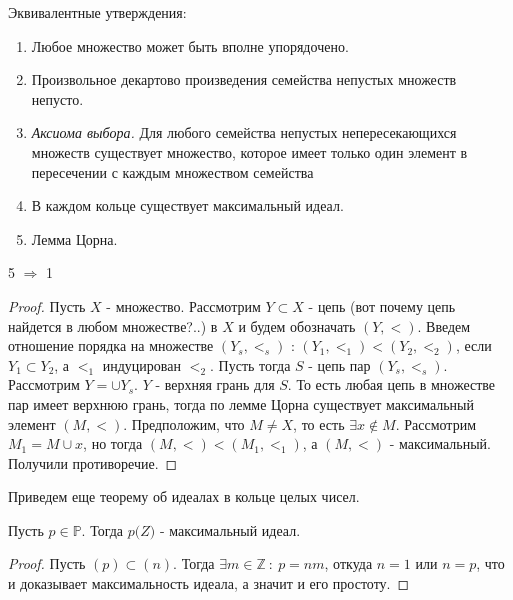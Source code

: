 \pagebreak

Эквивалентные утверждения:

\begin{enumerate}
  \item Любое множество может быть вполне упорядочено.
  \item Произвольное декартово произведения семейства непустых множеств непусто. 
  \item \emph{Аксиома выбора.} Для любого семейства непустых непересекающихся множеств существует множество, которое имеет
        только один элемент в пересечении с каждым множеством семейства
  \item В каждом кольце существует максимальный идеал.
  \item Лемма Цорна.
\end{enumerate}

\begin{thm}
  5 $ \Rightarrow $ 1
\end{thm}

\begin{proof}
  Пусть $ X $ - множество. Рассмотрим $ Y \subset X $ - цепь (вот почему цепь найдется в любом множестве?..) в $ X $ 
  и будем обозначать $ (Y, <) $. Введем отношение порядка
  на множестве $ (Y_{s}, <_{s}) $ : $ (Y_{1}, <_{1}) < (Y_{2}, <_{2}) $, если $ Y_{1} \subset Y_{2} $, а $ <_{1} $ индуцирован $ <_{2} $.
  Пусть тогда $ S $ - цепь пар $ (Y_{s}, <_{s}) $. Рассмотрим $ Y = \cup{Y_{s}} $. $ Y $ - верхняя грань для $ S $. То есть любая цепь
  в множестве пар имеет верхнюю грань, тогда по лемме Цорна существует максимальный элемент $ (M, <) $. Предположим, что $ M \ne X $, то есть
  $ \exists x \notin M $. Рассмотрим $ M_{1} = M \cup {x} $, но тогда $ (M, <) < (M_{1}, <_{1}) $, а $ (M, <) $ - максимальный. Получили
  противоречие.
\end{proof}

Приведем еще теорему об идеалах в кольце целых чисел.

\begin{thm}
  Пусть $ p \in \mathbb{P} $. Тогда $ p\mathbb(Z) $ - максимальный идеал. 
\end{thm}

\begin{proof}
  Пусть $ (p) \subset (n) $. Тогда $ \exists m \in \mathbb{Z} ~ : ~ p = nm $, откуда
  $ n = 1 $ или $ n = p $, что и доказывает максимальность идеала, а значит и его простоту.
\end{proof}


